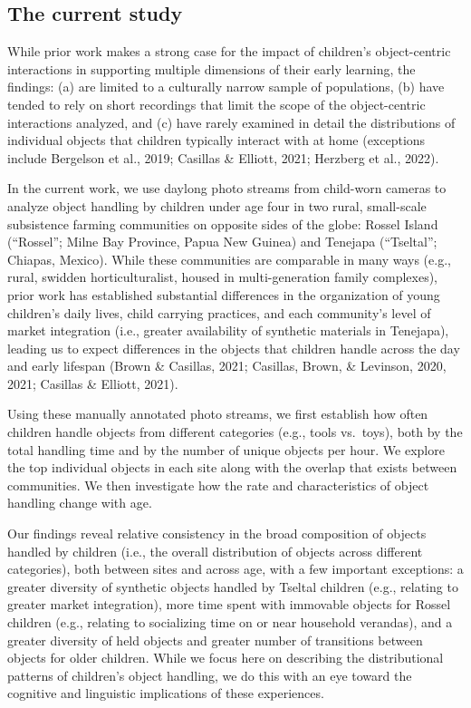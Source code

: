\documentclass[10pt, letterpaper]{article}
\begin{document}
\hypertarget{the-current-study}{%
\subsection{The current study}\label{the-current-study}}

While prior work makes a strong case for the impact of children's
object-centric interactions in supporting multiple dimensions of their
early learning, the findings: (a) are limited to a culturally narrow
sample of populations, (b) have tended to rely on short recordings that
limit the scope of the object-centric interactions analyzed, and (c)
have rarely examined in detail the distributions of individual objects
that children typically interact with at home (exceptions include
Bergelson et al., 2019; Casillas \& Elliott, 2021; Herzberg et al.,
2022).

In the current work, we use daylong photo streams from child-worn
cameras to analyze object handling by children under age four in two
rural, small-scale subsistence farming communities on opposite sides of
the globe: Rossel Island (``Rossel''; Milne Bay Province, Papua New
Guinea) and Tenejapa (``Tseltal''; Chiapas, Mexico). While these
communities are comparable in many ways (e.g., rural, swidden
horticulturalist, housed in multi-generation family complexes), prior
work has established substantial differences in the organization of
young children's daily lives, child carrying practices, and each
community's level of market integration (i.e., greater availability of
synthetic materials in Tenejapa), leading us to expect differences in
the objects that children handle across the day and early lifespan
(Brown \& Casillas, 2021; Casillas, Brown, \& Levinson, 2020, 2021;
Casillas \& Elliott, 2021).

Using these manually annotated photo streams, we first establish how
often children handle objects from different categories (e.g., tools
vs.~toys), both by the total handling time and by the number of unique
objects per hour. We explore the top individual objects in each site
along with the overlap that exists between communities. We then
investigate how the rate and characteristics of object handling change
with age.

Our findings reveal relative consistency in the broad composition of
objects handled by children (i.e., the overall distribution of objects
across different categories), both between sites and across age, with a
few important exceptions: a greater diversity of synthetic objects
handled by Tseltal children (e.g., relating to greater market
integration), more time spent with immovable objects for Rossel children
(e.g., relating to socializing time on or near household verandas), and
a greater diversity of held objects and greater number of transitions
between objects for older children. While we focus here on describing
the distributional patterns of children's object handling, we do this
with an eye toward the cognitive and linguistic implications of these
experiences.
\end{document}
